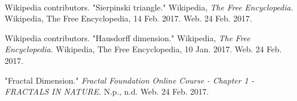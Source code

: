 \documentclass{article}
\begin{document}
\paragraph{}


\medskip

\begin{thebibliography}{9}
Wikipedia contributors. "Sierpinski triangle." Wikipedia, \textit{The Free Encyclopedia}. Wikipedia, The Free Encyclopedia, 14 Feb. 2017. Web. 24 Feb. 2017.

Wikipedia contributors. "Hausdorff dimension." Wikipedia, \textit{The Free Encyclopedia.} Wikipedia, The Free Encyclopedia, 10 Jan. 2017. Web. 24 Feb. 2017.

"Fractal Dimension." \textit{Fractal Foundation Online Course - Chapter 1 - FRACTALS IN NATURE.} N.p., n.d. Web. 24 Feb. 2017.
\end{thebibliography}
\end{document}
